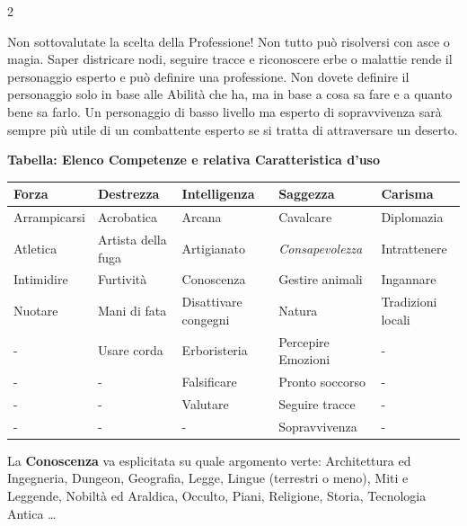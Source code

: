 \begin{multicols}{2}
\begin{giocatore}[Professione ???]
Non sottovalutate la scelta della Professione! Non tutto può risolversi con asce o magia. Saper districare nodi, seguire tracce e riconoscere erbe o malattie rende il personaggio esperto e può definire una professione. Non dovete definire il personaggio solo in base alle Abilità che ha, ma in base a cosa sa fare e a quanto bene sa farlo. Un personaggio di basso livello ma esperto di sopravvivenza sarà sempre più utile di un combattente esperto se si tratta di attraversare un deserto.\end{giocatore}

\end{multicols}

\medskip

\textbf{Tabella: Elenco Competenze e relativa Caratteristica d'uso}

\medskip\label{competenzeelenco}\hypertarget{competenzeelenco}{}

\noindent\begin{tabularx}{\linewidth}{lllll}
\toprule
\rowcolor{gray!20}\textbf{Forza} & \textbf{Destrezza} & \textbf{Intelligenza} & \textbf{Saggezza} & \textbf{Carisma}\\
\toprule
Arrampicarsi	& Acrobatica		& Arcana		&Cavalcare				& Diplomazia \\
\rowcolor{gray!20}Atletica		& Artista della fuga& Artigianato 	&\emph{Consapevolezza} 	& Intrattenere \\
Intimidire		& Furtività 		& Conoscenza	&Gestire animali		& Ingannare \\
\rowcolor{gray!20}Nuotare 		& Mani di fata		& Disattivare congegni &Natura			& Tradizioni locali \\
- & Usare corda	& Erboristeria		& Percepire Emozioni & - \\
\rowcolor{gray!20}- & -				& Falsificare		& Pronto soccorso	 & - \\
- & -				& Valutare			& Seguire tracce	 & - \\
\rowcolor{gray!20}- & -		        & -        			& Sopravvivenza      & - \\

\end{tabularx}

\medskip

La \textbf{Conoscenza} va esplicitata su quale argomento verte: Architettura ed Ingegneria, Dungeon, Geografia, Legge, Lingue (terrestri o meno), Miti e Leggende, Nobiltà ed Araldica, Occulto, Piani, Religione, Storia, Tecnologia Antica …

